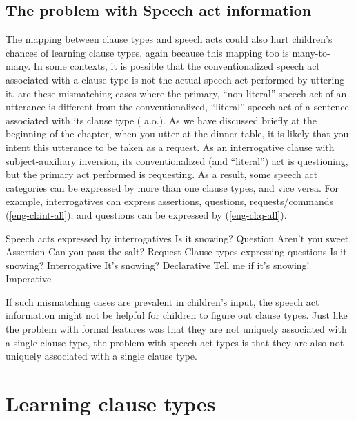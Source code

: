 \subsection{The problem with Speech act information}
The mapping between clause types and speech acts could also hurt children's chances of learning clause types, again because this mapping too is many-to-many. In some contexts, it is possible that the conventionalized speech act associated with a clause type is not the actual speech act performed by uttering it.  are these mismatching cases where the primary, ``non-literal'' speech act of an utterance is different from the conventionalized, ``literal'' speech act of a sentence associated with its clause type (\citealt{searle1975tax, searle1976class, bachharnish1979, searlevanderveken1985, portner2004, starr2014, portner2018, murraystarr2020} a.o.). As we have discussed briefly at the beginning of the chapter,  when you utter  at the dinner table, it is likely that you intent this utterance to be taken as a request. As an interrogative clause with subject-auxiliary inversion, its conventionalized (and ``literal'') act is questioning, but the primary act performed is requesting. As a result, some speech act categories can be expressed by more than one clause types, and vice versa. For example, interrogatives can express assertions, questions, requests/commands (\ref{eng-cl:int-all}); and questions can be expressed by \diis{} (\ref{eng-cl:q-all}).

Speech acts expressed by interrogatives 
\bxl Is it snowing? \hfill Question
\ex Aren't you sweet. \hfill Assertion
\ex Can you pass the salt? \hfill Request
\exl
\eex
{}
Clause types expressing questions
\bxl
Is it snowing? \hfill Interrogative
\ex It's snowing? \hfill Declarative
\ex Tell me if it's snowing! \hfill Imperative
\exl
\eex

If such mismatching cases are prevalent in children's input, the speech act information might not be helpful for children to figure out clause types. Just like the problem with formal features was that they are not uniquely associated with a single clause type, the problem with speech act types is that they are also not uniquely associated with a single clause type.


\section{Learning clause types}
\label{sec:intro:hypo}


